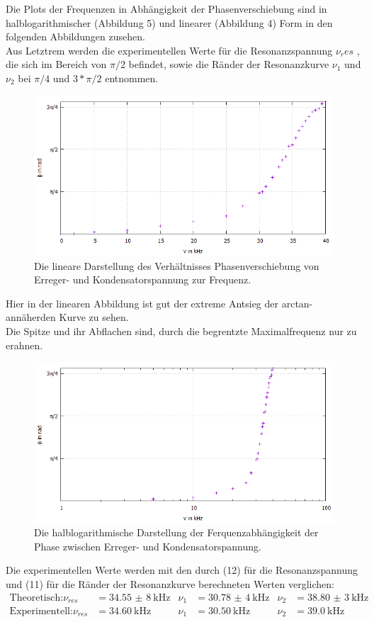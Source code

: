 Die Plots der Frequenzen in Abhängigkeit der Phasenverschiebung sind in halblogarithmischer (Abbildung 5) und linearer (Abbildung 4) Form in den folgenden Abbildungen zusehen.\\
Aus Letztrem werden die experimentellen Werte für die Resonanzspannung $\nu_res$ , die sich im Bereich von $\pi/2$ befindet, sowie die Ränder der Resonanzkurve $\nu_1$ und $\nu_2$ bei $\pi/4$ und $3*\pi/2$ entnommen.
\begin{figure}
  \centering
  \includegraphics[width=\textwidth]{Linear2.jpeg}
  \caption{Die lineare Darstellung des Verhältnisses Phasenverschiebung von Erreger- und Kondensatorspannung zur Frequenz.}
  \label{fig:Linear2}
\end{figure}
Hier in der linearen Abbildung ist gut der extreme Antsieg der arctan-annäherden Kurve zu sehen.\\Die Spitze und ihr Abflachen sind, durch die begrentzte Maximalfrequenz nur zu erahnen.
\begin{figure}
  \centering
  \includegraphics[width=\textwidth]{Halblog2.jpeg}
  \caption{Die halblogarithmische Darstellung der Ferquenzabhängigkeit der Phase zwischen Erreger- und Kondensatorspannung.}
  \label{fig:Halb2}
\end{figure}
\newpage
Die experimentellen Werte werden mit den durch (12) für die Resonanzspannung und (11) für die Ränder der Resonanzkurve berechneten Werten verglichen:
\begin{align*}
  \text{Theoretisch:}\nu_{res} &= \SI{34,55(8)}{\kilo\hertz} & \nu_1 &= \SI{30,78(4)}{\kilo\hertz} & \nu_2 &= \SI{38,80(3)}{\kilo\hertz}\\
  \text{Experimentell:}\nu_{res} &= \SI{34,60}{\kilo\hertz} & \nu_1 &= \SI{30,50}{\kilo\hertz} & \nu_2 &= \SI{39,0}{\kilo\hertz}
\end{align*}

\newpage

 

